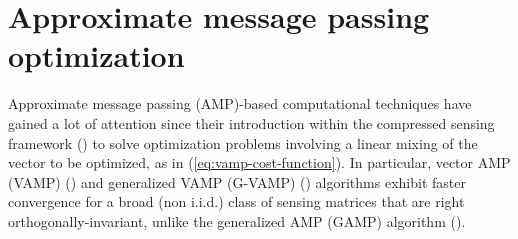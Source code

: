 \documentclass[pmlr,twocolumn,10pt]{jmlr} %
\begin{document}
\section{Approximate message passing optimization}
\vspace{-0.2cm}
Approximate message passing (AMP)-based computational techniques have gained a lot of attention since their introduction within the compressed sensing framework (\cite{donoho2009message}) to solve optimization problems involving a linear mixing of the vector to be optimized, as in (\ref{eq:vamp-cost-function}). In particular, vector AMP (VAMP) (\cite{rangan2019vector}) and generalized VAMP (G-VAMP) (\cite{schniter2016vector}) algorithms exhibit faster convergence for a broad (non i.i.d.) class of sensing matrices that are right orthogonally-invariant, unlike the generalized AMP (GAMP) algorithm (\cite{rangan2011generalized}).
\end{document}
